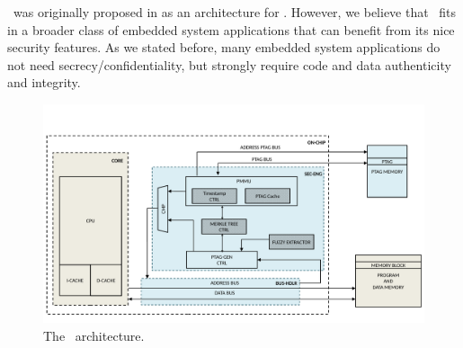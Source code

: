 


\cshia~was originally proposed in \cite{Hoffman2015} as an architecture for \iot. However, we believe that \cshia~fits in a broader class of embedded system applications that can benefit from its nice security features. As we stated before, many embedded system applications do not need secrecy\slash{}confidentiality, but strongly require code and data authenticity and integrity. 
\begin{figure}[H]
	\centering
	\includegraphics[width=\textwidth]{figures/pdf/CSHIA_detailed_caio_expansion.pdf}
	\caption{The \cshia~architecture.}
\end{figure}
